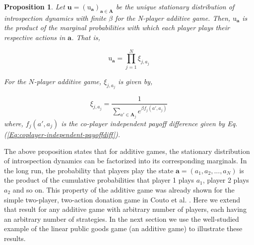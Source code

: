 \documentclass[11pt]{article}
\theoremstyle{plainCl1}
\newtheorem{Prop}{Proposition}
\theoremstyle{plainCl2}
\newcommand{\A}{\mathbf{A}}
\newcommand{\abf}{\mathbf{a}}
\newcommand{\ubf}{\mathbf{u}}
\begin{document}
\begin{Prop}
Let $\ubf = (\mathrm{u}_\abf)_{\abf \in \A}$ be the unique stationary distribution of introspection dynamics with finite $\beta$ for the N-player additive game. Then, $\mathrm{u}_\abf$ is the product of the marginal probabilities with which each player plays their respective actions in $\abf$. That is, 

\begin{equation}
\mathrm{u}_\abf = \prod_{j = 1}^N \xi_{j,a_j}
\label{Eq:additive-game-products}
\end{equation}

\noindent For the $N$-player additive game, $\xi_{j,a_j}$ is given by,

\begin{equation}
\xi_{j,a_j} = \frac{1}{\displaystyle \sum_{a' \in \A_j} e^{\beta f_j(a',a_j)}} 
\label{Eq:marginal-at-additive-game}
\end{equation}
\noindent where, $f_j(a', a_j)$ is the co-player independent payoff difference given by Eq. (\ref{Eq:coplayer-independent-payoffdiff}).
\label{Th:additive-game-product-of-marginals}
\end{Prop}
\noindent The above proposition states that for additive games, the stationary distribution of introspection dynamics can be factorized into its corresponding marginals. In the long run, the probability that players play the state $\abf = (a_1, a_2, ...,a_N)$ is the product of the cumulative probabilities that player 1 plays $a_1$, player 2 plays $a_2$ and so on. This property of the additive game was already shown for the simple two-player, two-action donation game in Couto et al. \cite{Couto:NJP:2022}.  Here we extend that result for any additive game with arbitrary number of players, each having an arbitrary number of strategies. In the next section we use the well-studied example of the linear public goods game (an additive game) to illustrate these results.
\end{document}
